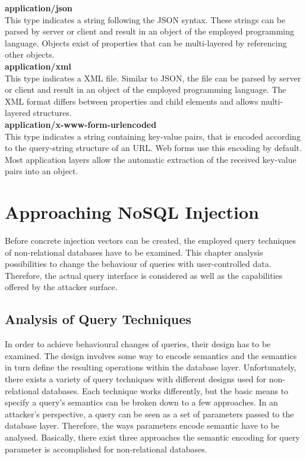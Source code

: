 \textbf{application/json} \\
This type indicates a string following the JSON syntax. These strings can be parsed by server or client and result in an object of the employed programming language. Objects exist of properties that can be multi-layered by referencing other objects. \\

\textbf{application/xml} \\
This type indicates a XML file. Similar to JSON, the file can be parsed by server or client and result in an object of the employed programming language. The XML format differs between properties and child elements and allows multi-layered structures.\\

\textbf{application/x-www-form-urlencoded} \\
This type indicates a string containing key-value pairs, that is encoded according to the query-string structure of an URL. Web forms use this encoding by default. Most application layers allow the automatic extraction of the received key-value pairs into an object.

\chapter{Approaching NoSQL Injection}
Before concrete injection vectors can be created, the employed query techniques of non-relational databases have to be examined. This chapter analysis possibilities to change the behaviour of queries with user-controlled data. Therefore, the actual query interface is considered as well as the capabilities offered by the attacker surface.

\section{Analysis of Query Techniques}
\label{sec:analysisOfQueryTechniques}
In order to achieve behavioural changes of queries, their design has to be examined. The design involves some way to encode semantics and the semantics in turn define the resulting operations within the database layer. Unfortunately, there exists a variety of query techniques with different designs used for non-relational databases. Each technique works differently, but the basic means to specify a query's semantics can be broken down to a few approaches. In an attacker's perspective, a query can be seen as a set of parameters passed to the database layer. Therefore, the ways parameters encode semantic have to be analysed. Basically, there exist three approaches the semantic encoding for query parameter is accomplished for non-relational databases.\\

